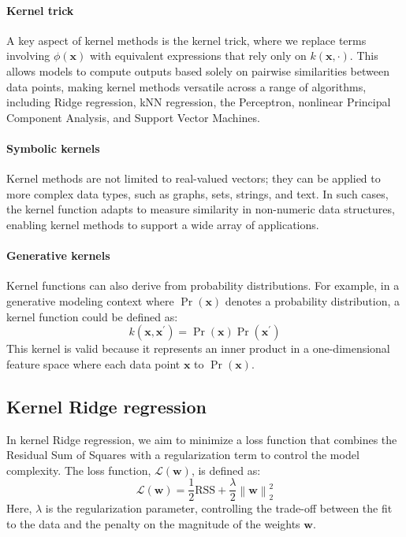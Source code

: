 \paragraph*{Kernel trick}
A key aspect of kernel methods is the kernel trick, where we replace terms involving $\phi(\mathbf{x})$ with equivalent expressions that rely only on $k(\mathbf{x},\cdot)$.
This allows models to compute outputs based solely on pairwise similarities between data points, making kernel methods versatile across a range of algorithms, including Ridge regression, kNN regression, the Perceptron, nonlinear Principal Component Analysis, and Support Vector Machines.

\paragraph*{Symbolic kernels}
Kernel methods are not limited to real-valued vectors; they can be applied to more complex data types, such as graphs, sets, strings, and text. In such cases, the kernel function adapts to measure similarity in non-numeric data structures, enabling kernel methods to support a wide array of applications.

\paragraph*{Generative kernels}
Kernel functions can also derive from probability distributions. 
For example, in a generative modeling context where $\Pr(\mathbf{x})$ denotes a probability distribution, a kernel function could be defined as:
\[k(\mathbf{x},\mathbf{x}^\prime)=\Pr(\mathbf{x})\Pr(\mathbf{x}^\prime)\]
This kernel is valid because it represents an inner product in a one-dimensional feature space where each data point $\mathbf{x}$ to $\Pr(\mathbf{x})$. 

\subsection{Kernel Ridge regression}
In kernel Ridge regression, we aim to minimize a loss function that combines the Residual Sum of Squares with a regularization term to control the model complexity.
The loss function, $\mathcal{L}(\mathbf{w})$, is defined as:
\[\mathcal{L}(\mathbf{w})=\dfrac{1}{2}\text{RSS}+\dfrac{\lambda}{2}{\left\lVert \mathbf{w}\right\rVert}_2^2\]
Here, $\lambda$ is the regularization parameter, controlling the trade-off between the fit to the data and the penalty on the magnitude of the weights $\mathbf{w}$. 

